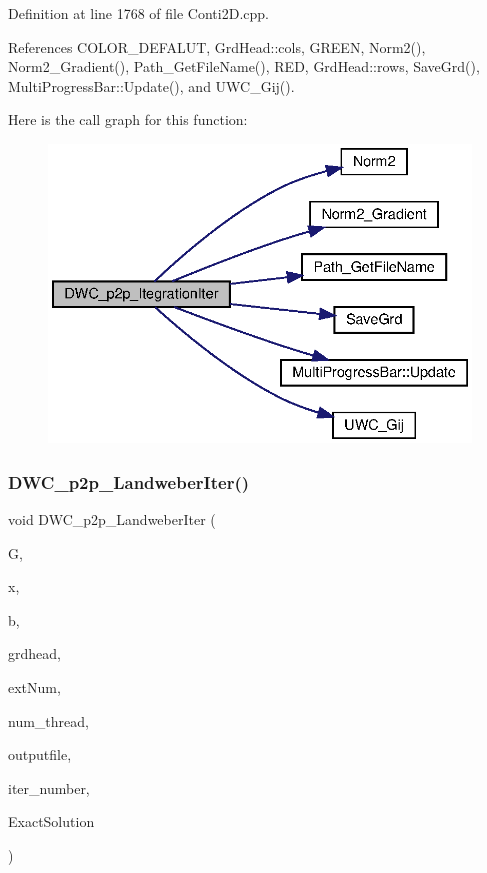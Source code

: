 Definition at line 1768 of file Conti2\+D.\+cpp.



References C\+O\+L\+O\+R\+\_\+\+D\+E\+F\+A\+L\+UT, Grd\+Head\+::cols, G\+R\+E\+EN, Norm2(), Norm2\+\_\+\+Gradient(), Path\+\_\+\+Get\+File\+Name(), R\+ED, Grd\+Head\+::rows, Save\+Grd(), Multi\+Progress\+Bar\+::\+Update(), and U\+W\+C\+\_\+\+Gij().

Here is the call graph for this function\+:
\nopagebreak
\begin{figure}[H]
\begin{center}
\leavevmode
\includegraphics[width=334pt]{Conti2D_8cpp_ad9d4ab56b3ff557565d82cf01ab598ad_ad9d4ab56b3ff557565d82cf01ab598ad_cgraph}
\end{center}
\end{figure}
\mbox{\label{Conti2D_8cpp_a9a4db1b002682739ba7b888c536da886_a9a4db1b002682739ba7b888c536da886}} 
\subsubsection{D\+W\+C\+\_\+p2p\+\_\+\+Landweber\+Iter()}
{\footnotesize\ttfamily void D\+W\+C\+\_\+p2p\+\_\+\+Landweber\+Iter (\begin{DoxyParamCaption}\item[{double $\ast$}]{G,  }\item[{double $\ast$}]{x,  }\item[{double $\ast$}]{b,  }\item[{\textbf{ Grd\+Head}}]{grdhead,  }\item[{int}]{ext\+Num,  }\item[{int}]{num\+\_\+thread,  }\item[{string}]{outputfile,  }\item[{double}]{iter\+\_\+number,  }\item[{double $\ast$}]{Exact\+Solution }\end{DoxyParamCaption})}



